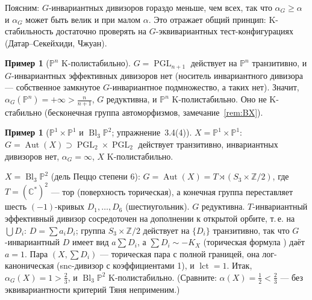 \documentclass[11pt,a4paper]{article}
\theoremstyle{plain}
\theoremstyle{definition}
\newtheorem{example}[theorem]{Пример}
\theoremstyle{remark}
\renewcommand{\C}{\mathbb{C}}
\newcommand{\Z}{\mathbb{Z}}
\newcommand{\PP}{\mathbb{P}}
\DeclareMathOperator{\Bl}{Bl}
\DeclareMathOperator{\PGL}{PGL}
\DeclareMathOperator{\Aut}{Aut}
\DeclareMathOperator{\lct}{lct}
\begin{document}
Поясним: $G$-инвариантных дивизоров гораздо меньше, чем всех, так что $\alpha_G\ge\alpha$ и
$\alpha_G$ может быть велик и при малом $\alpha$. Это отражает общий принцип: K-стабильность
достаточно проверять на $G$-эквивариантных тест-конфигурациях (Датар--Секейхиди, Чжуан).

\begin{example}[$\PP^n$ K-полистабильно]\label{ex:Pn-polystable}
$G=\PGL_{n+1}$ действует на $\PP^n$ транзитивно, и $G$-инвариантных эффективных дивизоров нет
(носитель инвариантного дивизора --- собственное замкнутое $G$-инвариантное подмножество, а
таких нет). Значит, $\alpha_G(\PP^n)=+\infty>\frac n{n+1}$, $G$ редуктивна, и $\PP^n$ K-полистабильно.
Оно не K-стабильно (бесконечная группа автоморфизмов, замечание~\ref{rem:BX}).
\end{example}

\begin{example}[$\PP^1\times\PP^1$ и $\Bl_3\PP^2$; упражнение~3.4(4)]\label{ex:dP8-dP6-polystable}
\emph{$X=\PP^1\times\PP^1$}: $G=\Aut(X)\supset\PGL_2\times\PGL_2$ действует транзитивно, инвариантных
дивизоров нет, $\alpha_G=\infty$, $X$ K-полистабильно.

\emph{$X=\Bl_3\PP^2$} (дель Пеццо степени 6): $G=\Aut(X)=T\rtimes(S_3\times\Z/2)$, где
$T=(\C^*)^2$ --- тор (поверхность торическая), а конечная группа переставляет
шесть $(-1)$-кривых $D_1,\dots,D_6$ (шестиугольник). $G$ редуктивна. $T$-инвариантный эффективный
дивизор сосредоточен на дополнении к открытой орбите, т.\,е. на $\bigcup D_i$: $D=\sum a_iD_i$;
группа $S_3\times\Z/2$ действует на $\{D_i\}$ транзитивно, так что $G$-инвариантный $D$ имеет вид
$a\sum D_i$, а $\sum D_i\sim-K_X$ (торическая формула \cite[8.2.3]{CLS}) даёт $a=1$. Пара
$(X,\sum D_i)$ --- торическая пара с полной границей, она лог-каноническая (snc-дивизор с
коэффициентами 1), и $\lct=1$. Итак, $\alpha_G(X)=1>\frac23$, и $\Bl_3\PP^2$ K-полистабильно.
(Сравните: $\alpha(X)=\frac12<\frac23$ --- без эквивариантности критерий Тяня неприменим.)
\end{example}
\end{document}
